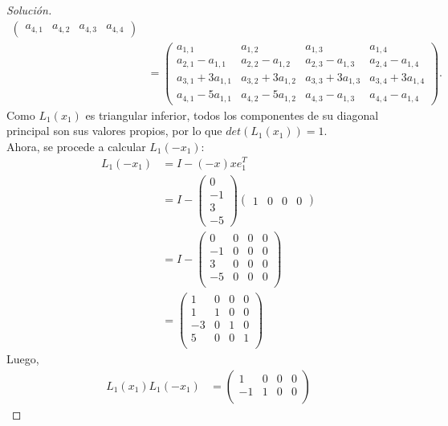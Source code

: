 \documentclass[12pt]{book}
\newenvironment{solucion}
  {\renewcommand\qedsymbol{$\square$}\begin{proof}[Solución]}
  {\end{proof}}
\begin{document}
\begin{solucion}
\begin{align*}
\begin{pmatrix}
    a_{4,1} & a_{4,2} & a_{4,3} & a_{4,4}
    \end{pmatrix}\\[8pt]
    &=\begin{pmatrix}
    a_{1,1} & a_{1,2} & a_{1,3} & a_{1,4}\\
    a_{2,1}-a_{1,1} & a_{2,2}-a_{1,2} & a_{2,3}-a_{1,3} & a_{2,4}-a_{1,4}\\
    a_{3,1}+3a_{1,1} & a_{3,2}+3a_{1,2} & a_{3,3}+3a_{1,3} & a_{3,4}+3a_{1,4}\\
    a_{4,1}-5a_{1,1} & a_{4,2}-5a_{1,2} & a_{4,3}-a_{1,3} & a_{4,4}-a_{1,4}
    \end{pmatrix}.
\end{align*}
Como $L_1(x_1)$ es triangular inferior, todos los componentes de su diagonal principal son sus valores propios, por lo que $det\left(L_1(x_1)\right)=1$.\\
Ahora, se procede a calcular $L_1(-x_1)$:
\begin{align*}
    L_1(-x_1)&=I-(-x)xe_1^T\\[8pt]
    &=I-\begin{pmatrix}
    0\\
    -1\\
    3\\
    -5
    \end{pmatrix}\begin{pmatrix}
    1 & 0 & 0 & 0
    \end{pmatrix}\\[8pt]
    &= I-\begin{pmatrix}
    0 & 0 & 0 & 0\\
    -1 & 0 & 0 & 0\\
    3 & 0 & 0 & 0\\
    -5 & 0 & 0 & 0\\
    \end{pmatrix}\\[8pt]
    &=\begin{pmatrix}
    1 & 0 & 0 & 0\\
    1 & 1 & 0 & 0\\
    -3 & 0 & 1 & 0\\
    5 & 0 & 0 & 1\\
    \end{pmatrix}
\end{align*}
Luego,
\begin{align*}
    L_1(x_1)L_1(-x_1)&=\begin{pmatrix}
    1 & 0 & 0 & 0\\
    -1 & 1 & 0 & 0\\

\end{pmatrix}
\end{align*}
\end{solucion}
\end{document}
